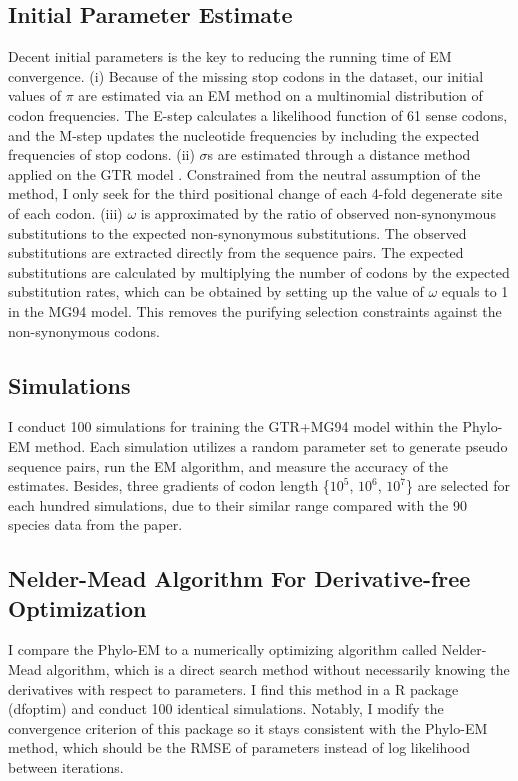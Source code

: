 \subsection{Initial Parameter Estimate}
Decent initial parameters is the key to reducing the running time of EM convergence. (i) Because of the missing stop codons in the dataset, our initial values of $\pi$ are estimated via an EM method on a multinomial distribution of codon frequencies. The E-step calculates a likelihood function of 61 sense codons, and the M-step updates the nucleotide frequencies by including the expected frequencies of stop codons. (ii) $\sigma$s are estimated through a distance method applied on the GTR model \parencite{felsenstein2004inferring}. Constrained from the neutral assumption of the method, I only seek for the third positional change of each 4-fold degenerate site of each codon. (iii) $\omega$ is approximated by the ratio of observed non-synonymous substitutions to the expected non-synonymous substitutions. The observed substitutions are extracted directly from the sequence pairs. The expected substitutions are calculated by multiplying the number of codons by the expected substitution rates, which can be obtained by setting up the value of $\omega$ equals to 1 in the MG94 model. This removes the purifying selection constraints against the non-synonymous codons.  

\subsection{Simulations}
I conduct 100 simulations for training the GTR+MG94 model within the Phylo-EM method. Each simulation utilizes a random parameter set to generate pseudo sequence pairs, run the EM algorithm, and measure the accuracy of the estimates. Besides, three gradients of codon length \{$10^5$, $10^6$, $10^7$\} are selected for each hundred simulations, due to their similar range compared with the 90 species data from the paper. 

\subsection{Nelder-Mead Algorithm For Derivative-free Optimization}
I compare the Phylo-EM to a numerically optimizing algorithm called Nelder-Mead algorithm, which is a direct search method without necessarily knowing the derivatives with respect to parameters. I find this method in a R package (dfoptim) and conduct 100 identical simulations. 
Notably, I modify the convergence criterion of this package so it stays consistent with the Phylo-EM method, which should be the RMSE of parameters instead of log likelihood between iterations. 



